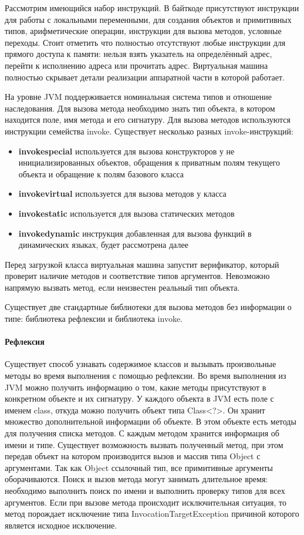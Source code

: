 Рассмотрим имеющийся набор инструкций. В байткоде присутствуют инструкции для работы с локальными переменными, для создания объектов и примитивных типов, арифметические операции, инструкции для вызова методов, условные переходы. Стоит отметить что полностью отсутствуют любые инструкции для прямого доступа к памяти: нельзя взять указатель на определённый адрес, перейти к исполнению адреса или прочитать адрес. Виртуальная машина полностью скрывает детали реализации аппаратной части в которой работает.

На уровне JVM поддерживается номинальная система типов и отношение наследования. Для вызова метода необходимо знать тип объекта, в котором находится поле, имя метода и его сигнатуру. Для вызова методов используются инструкции семейства invoke. Существует несколько разных invoke-инструкций:
\begin{itemize}
    \item \textbf{invokespecial} используется для вызова конструкторов у не инициализированных объектов, обращения к приватным полям текущего объекта и обращение к полям базового класса
    \item \textbf{invokevirtual} используется для вызова методов у класса
    \item \textbf{invokestatic} используется для вызова статических методов
    \item \textbf{invokedynamic} инструкция добавленная для вызова функций в динамических языках, будет рассмотрена далее
\end{itemize}
Перед загрузкой класса виртуальная машина запустит верификатор, который проверит наличие методов и соответствие типов аргументов. Невозможно напрямую вызвать метод, если неизвестен реальный тип объекта.

Существует две стандартные библиотеки для вызова методов без информации о типе: библиотека рефлексии и библиотека invoke.
\paragraph{Рефлексия}
Существует способ узнавать содержимое классов и вызывать произвольные методы во время выполнения с помощью рефлексии\cite{jvm:reflection}. Во время выполнения из JVM можно получить информацию о том, какие методы присутствуют в конкретном объекте и их сигнатуру. У каждого объекта в JVM есть поле с именем class, откуда можно получить объект типа Class<?>. Он хранит множество дополнительной информации об объекте. В этом объекте есть методы для получения списка методов. С каждым методом хранится информация об имени и типе. Существует возможность вызвать полученный метод, при этом передав объект на котором производится вызов и массив типа Object с аргументами. Так как Object ссылочный тип, все примитивные аргументы оборачиваются. Поиск и вызов метода могут занимать длительное время: необходимо выполнить поиск по имени и выполнить проверку типов для всех аргументов. Если при вызове метода происходит исключительная ситуация, то метод порождает исключение типа InvocationTargetException причиной которого является исходное исключение.

